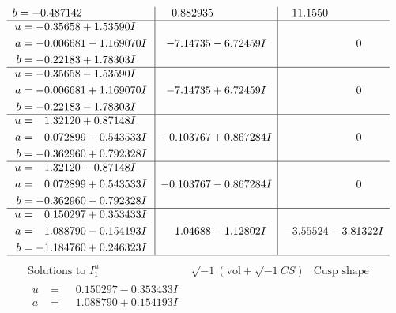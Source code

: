 \documentclass[1p]{elsarticle_modified}
\theoremstyle{definition}
\newcommand{\I}{\sqrt{-1}}
\begin{document}
$$\begin{array}{c|c|c}
\begin{aligned}
b &= -0.487142\phantom{ +0.000000I}\end{aligned}
 & \phantom{-}0.882935\phantom{ +0.000000I} & \phantom{-}11.1550\phantom{ +0.000000I} \\ \hline\begin{aligned}
u &= -0.35658 + 1.53590 I \\
a &= -0.006681 - 1.169070 I \\
b &= -0.22183 + 1.78303 I\end{aligned}
 & -7.14735 - 6.72459 I & \phantom{-0.000000 } 0 \\ \hline\begin{aligned}
u &= -0.35658 - 1.53590 I \\
a &= -0.006681 + 1.169070 I \\
b &= -0.22183 - 1.78303 I\end{aligned}
 & -7.14735 + 6.72459 I & \phantom{-0.000000 } 0 \\ \hline\begin{aligned}
u &= \phantom{-}1.32120 + 0.87148 I \\
a &= \phantom{-}0.072899 - 0.543533 I \\
b &= -0.362960 + 0.792328 I\end{aligned}
 & -0.103767 + 0.867284 I & \phantom{-0.000000 } 0 \\ \hline\begin{aligned}
u &= \phantom{-}1.32120 - 0.87148 I \\
a &= \phantom{-}0.072899 + 0.543533 I \\
b &= -0.362960 - 0.792328 I\end{aligned}
 & -0.103767 - 0.867284 I & \phantom{-0.000000 } 0 \\ \hline\begin{aligned}
u &= \phantom{-}0.150297 + 0.353433 I \\
a &= \phantom{-}1.088790 - 0.154193 I \\
b &= -1.184760 + 0.246323 I\end{aligned}
 & \phantom{-}1.04688 - 1.12802 I & -3.55524 - 3.81322 I\\
 \hline 
 \end{array}$$\newpage$$\begin{array}{c|c|c}  
\text{Solutions to }I^u_{1}& \I (\text{vol} + \sqrt{-1}CS) & \text{Cusp shape}\\
 \hline 
\begin{aligned}
u &= \phantom{-}0.150297 - 0.353433 I \\
a &= \phantom{-}1.088790 + 0.154193 I \\

\end{aligned}
\end{array}$$
\end{document}
